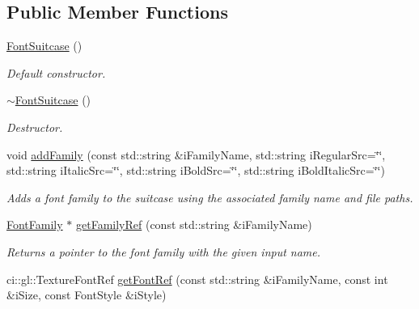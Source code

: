 \subsection*{Public Member Functions}
\begin{DoxyCompactItemize}
\item 
\hypertarget{class_font_suitcase_a7a8f4187809d2509d2e2042b327c845f}{\hyperlink{class_font_suitcase_a7a8f4187809d2509d2e2042b327c845f}{Font\-Suitcase} ()}\label{class_font_suitcase_a7a8f4187809d2509d2e2042b327c845f}

\begin{DoxyCompactList}\small\item\em Default constructor. \end{DoxyCompactList}\item 
\hypertarget{class_font_suitcase_af976ecaea23388d339df65a45297125d}{\hyperlink{class_font_suitcase_af976ecaea23388d339df65a45297125d}{$\sim$\-Font\-Suitcase} ()}\label{class_font_suitcase_af976ecaea23388d339df65a45297125d}

\begin{DoxyCompactList}\small\item\em Destructor. \end{DoxyCompactList}\item 
\hypertarget{class_font_suitcase_afecc98e12efd6a21be39c273533f3a99}{void \hyperlink{class_font_suitcase_afecc98e12efd6a21be39c273533f3a99}{add\-Family} (const std\-::string \&i\-Family\-Name, std\-::string i\-Regular\-Src=\char`\"{}\char`\"{}, std\-::string i\-Italic\-Src=\char`\"{}\char`\"{}, std\-::string i\-Bold\-Src=\char`\"{}\char`\"{}, std\-::string i\-Bold\-Italic\-Src=\char`\"{}\char`\"{})}\label{class_font_suitcase_afecc98e12efd6a21be39c273533f3a99}

\begin{DoxyCompactList}\small\item\em Adds a font family to the suitcase using the associated family name and file paths. \end{DoxyCompactList}\item 
\hypertarget{class_font_suitcase_ab549697f57176702d295d206ae814062}{\hyperlink{class_font_family}{Font\-Family} $\ast$ \hyperlink{class_font_suitcase_ab549697f57176702d295d206ae814062}{get\-Family\-Ref} (const std\-::string \&i\-Family\-Name)}\label{class_font_suitcase_ab549697f57176702d295d206ae814062}

\begin{DoxyCompactList}\small\item\em Returns a pointer to the font family with the given input name. \end{DoxyCompactList}\item 
\hypertarget{class_font_suitcase_ad71b7b70960ecdba8ad45cf13de7ee39}{ci\-::gl\-::\-Texture\-Font\-Ref \hyperlink{class_font_suitcase_ad71b7b70960ecdba8ad45cf13de7ee39}{get\-Font\-Ref} (const std\-::string \&i\-Family\-Name, const int \&i\-Size, const Font\-Style \&i\-Style)}\label{class_font_suitcase_ad71b7b70960ecdba8ad45cf13de7ee39}


\end{DoxyCompactItemize}
